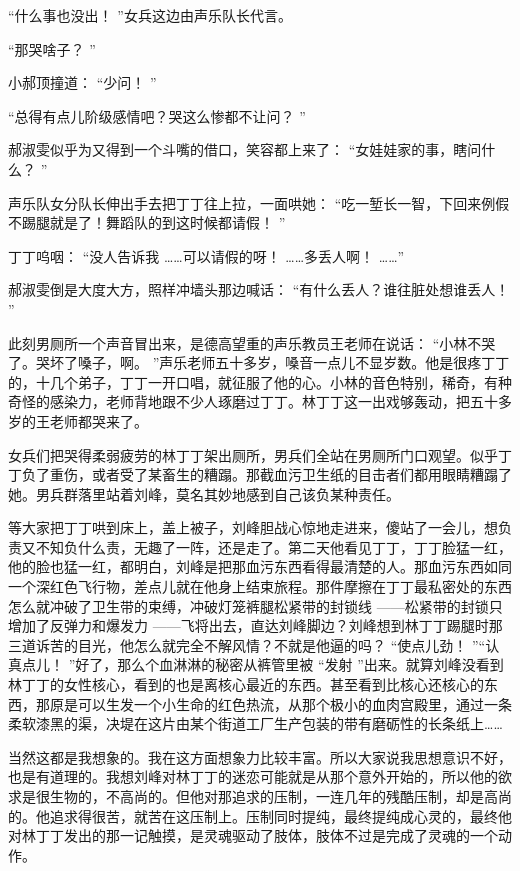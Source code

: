 \documentclass[12pt,twoside,openany]{book}
\begin{document}
“什么事也没出！ ”女兵这边由声乐队长代言。

“那哭啥子？ ”

小郝顶撞道： “少问！ ”

“总得有点儿阶级感情吧？哭这么惨都不让问？ ”

郝淑雯似乎为又得到一个斗嘴的借口，笑容都上来了： “女娃娃家的事，瞎问什么？ ”

声乐队女分队长伸出手去把丁丁往上拉，一面哄她： “吃一堑长一智，下回来例假不踢腿就是了！舞蹈队的到这时候都请假！ ”

丁丁呜咽： “没人告诉我 ……可以请假的呀！ ……多丢人啊！ ……”

郝淑雯倒是大度大方，照样冲墙头那边喊话： “有什么丢人？谁往脏处想谁丢人！ ”

此刻男厕所一个声音冒出来，是德高望重的声乐教员王老师在说话： “小林不哭了。哭坏了嗓子，啊。 ”声乐老师五十多岁，嗓音一点儿不显岁数。他是很疼丁丁的，十几个弟子，丁丁一开口唱，就征服了他的心。小林的音色特别，稀奇，有种奇怪的感染力，老师背地跟不少人琢磨过丁丁。林丁丁这一出戏够轰动，把五十多岁的王老师都哭来了。

女兵们把哭得柔弱疲劳的林丁丁架出厕所，男兵们全站在男厕所门口观望。似乎丁丁负了重伤，或者受了某畜生的糟蹋。那截血污卫生纸的目击者们都用眼睛糟蹋了她。男兵群落里站着刘峰，莫名其妙地感到自己该负某种责任。

等大家把丁丁哄到床上，盖上被子，刘峰胆战心惊地走进来，傻站了一会儿，想负责又不知负什么责，无趣了一阵，还是走了。第二天他看见丁丁，丁丁脸猛一红，他的脸也猛一红，都明白，刘峰是把那血污东西看得最清楚的人。那血污东西如同一个深红色飞行物，差点儿就在他身上结束旅程。那件摩擦在丁丁最私密处的东西怎么就冲破了卫生带的束缚，冲破灯笼裤腿松紧带的封锁线 ——松紧带的封锁只增加了反弹力和爆发力 ——飞将出去，直达刘峰脚边？刘峰想到林丁丁踢腿时那三道诉苦的目光，他怎么就完全不解风情？不就是他逼的吗？ “使点儿劲！ ”“认真点儿！ ”好了，那么个血淋淋的秘密从裤管里被 “发射 ”出来。就算刘峰没看到林丁丁的女性核心，看到的也是离核心最近的东西。甚至看到比核心还核心的东西，那原是可以生发一个小生命的红色热流，从那个极小的血肉宫殿里，通过一条柔软漆黑的渠，决堤在这片由某个街道工厂生产包装的带有磨砺性的长条纸上……

当然这都是我想象的。我在这方面想象力比较丰富。所以大家说我思想意识不好，也是有道理的。我想刘峰对林丁丁的迷恋可能就是从那个意外开始的，所以他的欲求是很生物的，不高尚的。但他对那追求的压制，一连几年的残酷压制，却是高尚的。他追求得很苦，就苦在这压制上。压制同时提纯，最终提纯成心灵的，最终他对林丁丁发出的那一记触摸，是灵魂驱动了肢体，肢体不过是完成了灵魂的一个动作。
\end{document}
